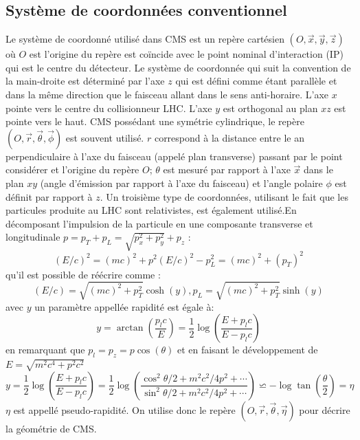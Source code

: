 \subsection{Système de coordonnées conventionnel}
Le système de coordonné utilisé dans CMS est un repère cartésien $\left(O,\vec{x},\vec{y},\vec{z}\right)$ où $O$ est l'origine du repère est coïncide avec le point nominal d'interaction (IP) qui est le centre du détecteur. Le système de coordonnée qui suit la convention de la main-droite est déterminé par l'axe $z$ qui est défini comme étant parallèle et dans la même direction que le faisceau allant dans le sens anti-horaire. L'axe $x$ pointe vers le centre du collisionneur LHC. L'axe $y$ est orthogonal au plan $xz$ est pointe vers le haut. CMS possédant une symétrie cylindrique, le repère $\left(O,\vec{r},\vec{\theta},\vec{\phi}\right)$ est souvent utilisé. $r$ correspond à la distance entre le an perpendiculaire à l'axe du faisceau (appelé plan transverse) passant par le point considérer et l'origine du repère $O$; $\theta$ est mesuré par rapport à l'axe $\vec{x}$ dans le plan $xy$ (angle d'émission par rapport à l'axe du faisceau) et l'angle polaire $\phi$ est définit par rapport à $z$. Un troisième type de coordonnées, utilisant le fait que les particules produite au LHC sont relativistes, est également utilisé.En décomposant l'impulsion de la particule en une composante transverse et longitudinale $p=p_{T}+p_{L}=\sqrt{p_{x}^{2}+p_{y}^{2}}+p_{z}$ :
\begin{equation}
( E/c)^{2}=(mc)^{2}+p^{2} (E/c)^{2}-p_{L}^{2}=(mc)^{2}+(p_{T})^{2} 
\end{equation}
qu'il est possible de réécrire comme :
\begin{equation}
\left( E/c \right)=\sqrt{\left( mc \right)^{2}+p_{T}^{2}}\cosh(y), p_{L}=\sqrt{\left( mc \right)^{2}+p_{T}^{2}}\sinh(y)
\end{equation}
avec $y$ un paramètre appellée rapidité est égale à:
\begin{equation}
y=\arctan\left(\frac{p_{l}c}{E}\right)=\frac{1}{2}\log\left(\frac{E+p_{l}c}{E-p_{l}c}\right)
\end{equation}
en remarquant que $p_{l}=p_{z}=p\cos(\theta)$ et en faisant le développement de $E=\sqrt{m^{2}c^{4}+p^{2}c^{2}}$
\begin{equation}
y=\frac{1}{2} \log\left(\frac{E+p_{l}c}{E-p_{l}c}\right)=\frac{1}{2}\log\left(\frac{\cos^2 \theta/2+m^{2}c^{2}/4p^{2}+\cdots}{\sin^2 \theta/2+m^{2}c^{2}/4p^{2}+\cdots}\right)\backsimeq-\log\tan\left(\frac{\theta}{2}\right)=\eta
\end{equation}
$\eta$ est appellé pseudo-rapidité. On utilise donc le repère $\left(O,\vec{r},\vec{\theta},\vec{\eta}\right)$ pour décrire la géométrie de CMS.


